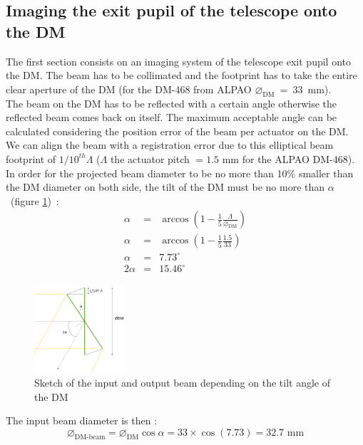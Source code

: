\documentclass[12pt,a4paper]{article}
\begin{document}
\subsection{Imaging the exit pupil of the telescope onto the DM}
The first section consists on an imaging system of the telescope exit pupil onto the DM. The beam has to be collimated and the footprint has to take the entire clear aperture of the DM (for the DM-468 from ALPAO $\diameter_{\text{DM}}$~=~33~mm).\\
The beam on the DM has to be reflected with a certain angle otherwise the reflected beam comes back on itself. The maximum acceptable angle can be calculated considering the position error of the beam per actuator on the DM. We can align the beam with a registration error due to this elliptical beam footprint of $1/10^{th} \Lambda$ ($\Lambda$ the actuator pitch $= 1.5$ mm for the ALPAO DM-468). In order for the projected beam diameter to be no more than 10\% smaller than the DM diameter on both side, the tilt of the DM must be no more than $\alpha$~(figure \ref{fig:OAP0_DM_diam_beam_diam})~:
\begin{eqnarray}
	\alpha &= &\arccos\left(1-\frac{1}{5}\frac{\Lambda}{\diameter_{\text{DM}}}\right)\nonumber\\
	\alpha &= &\arccos\left(1-\frac{1}{5}\frac{1.5}{33}\right)\nonumber\\
	\alpha &= &7.73^{ \circ}\label{eq:alphaDM}\\
	2\alpha &= &15.46^{ \circ}\nonumber
\end{eqnarray}

\begin{figure}[H]
	\begin{center}
		\includegraphics[width=0.3\textwidth]{images/OAP0_DM_diam_beam_diam.PNG}
		\caption{Sketch of the input and output beam depending on the tilt angle of the DM}\label{fig:OAP0_DM_diam_beam_diam}
	\end{center}
\end{figure}
The input beam diameter is then :
\begin{equation}
	\diameter_{\text{DM-beam}} = \diameter_{\text{DM}} \cos{\alpha} = 33\times \cos{(7.73)} = 32.7 \text{ mm}
\end{equation}
\end{document}
